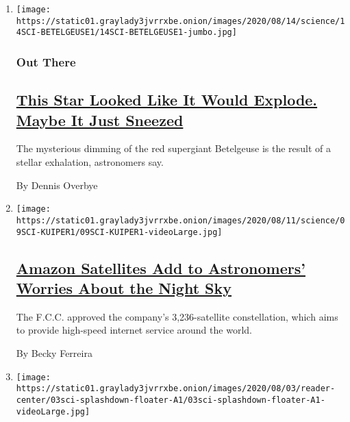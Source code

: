 \begin{enumerate}
\def\labelenumi{\arabic{enumi}.}
\item
  \texttt{[image: https://static01.graylady3jvrrxbe.onion/images/2020/08/14/science/14SCI-BETELGEUSE1/14SCI-BETELGEUSE1-jumbo.jpg]}

  \hypertarget{out-there}{%
  \subsubsection{Out There}\label{out-there}}

  \hypertarget{this-star-looked-like-it-would-explode-maybe-it-just-sneezed}{%
  \subsection{\texorpdfstring{\href{/2020/08/14/science/betelgeuse-star-supernova.html}{This
  Star Looked Like It Would Explode. Maybe It Just
  Sneezed}}{This Star Looked Like It Would Explode. Maybe It Just Sneezed}}\label{this-star-looked-like-it-would-explode-maybe-it-just-sneezed}}

  The mysterious dimming of the red supergiant Betelgeuse is the result
  of a stellar exhalation, astronomers say.

  By Dennis Overbye
\item
  \texttt{[image: https://static01.graylady3jvrrxbe.onion/images/2020/08/11/science/09SCI-KUIPER1/09SCI-KUIPER1-videoLarge.jpg]}

  \hypertarget{amazon-satellites-add-to-astronomers-worries-about-the-night-sky}{%
  \subsection{\texorpdfstring{\href{/2020/08/10/science/amazon-project-kuiper.html}{Amazon
  Satellites Add to Astronomers' Worries About the Night
  Sky}}{Amazon Satellites Add to Astronomers' Worries About the Night Sky}}\label{amazon-satellites-add-to-astronomers-worries-about-the-night-sky}}

  The F.C.C. approved the company's 3,236-satellite constellation, which
  aims to provide high-speed internet service around the world.

  By Becky Ferreira
\item
  \texttt{[image: https://static01.graylady3jvrrxbe.onion/images/2020/08/03/reader-center/03sci-splashdown-floater-A1/03sci-splashdown-floater-A1-videoLarge.jpg]}

  \hypertarget{thanks-for-flying-spacex-nasa-astronauts-safely-splash-down-after-journey-from-orbit}{%
}
\end{enumerate}
